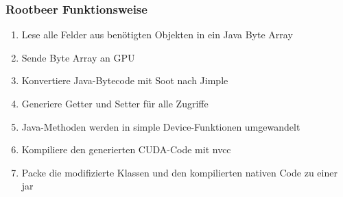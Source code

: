 \begin{frame}
    \frametitle{Rootbeer Funktionsweise}
    \begin{enumerate}
        \item Lese alle Felder aus benötigten Objekten in ein Java Byte Array
        \item Sende Byte Array an GPU
        \item Konvertiere Java-Bytecode mit Soot nach Jimple %
        \item Generiere Getter und Setter für alle Zugriffe %
        \item Java-Methoden werden in simple Device-Funktionen umgewandelt %
        \item Kompiliere den generierten CUDA-Code mit nvcc
        \item Packe die modifizierte Klassen und den kompilierten nativen Code zu einer jar
    \end{enumerate}

\end{frame}
